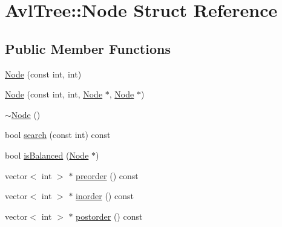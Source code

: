 \hypertarget{struct_avl_tree_1_1_node}{}\section{Avl\+Tree\+:\+:Node Struct Reference}
\label{struct_avl_tree_1_1_node}
\subsection*{Public Member Functions}
\begin{DoxyCompactItemize}
\item 
\mbox{\hyperlink{struct_avl_tree_1_1_node_a839da38cdb6f85ea5a62aae90b0715bc}{Node}} (const int, int)
\item 
\mbox{\hyperlink{struct_avl_tree_1_1_node_a5cecfa155288f9a123fe60206730bbce}{Node}} (const int, int, \mbox{\hyperlink{struct_avl_tree_1_1_node}{Node}} $\ast$, \mbox{\hyperlink{struct_avl_tree_1_1_node}{Node}} $\ast$)
\item 
\mbox{\hyperlink{struct_avl_tree_1_1_node_a772d991375b38b592da8a22f82ac343f}{$\sim$\+Node}} ()
\item 
bool \mbox{\hyperlink{struct_avl_tree_1_1_node_a9e6723c6082511451be1b87284201921}{search}} (const int) const
\item 
bool \mbox{\hyperlink{struct_avl_tree_1_1_node_aaacdd39b8f7f3ab623b4cacb28d098f9}{is\+Balanced}} (\mbox{\hyperlink{struct_avl_tree_1_1_node}{Node}} $\ast$)
\item 
vector$<$ int $>$ $\ast$ \mbox{\hyperlink{struct_avl_tree_1_1_node_a32cdbc0d1dece3f4885bf9eed0643dc0}{preorder}} () const
\item 
vector$<$ int $>$ $\ast$ \mbox{\hyperlink{struct_avl_tree_1_1_node_a6a079f1ec29ec22d78eda81218f61ead}{inorder}} () const
\item 
vector$<$ int $>$ $\ast$ \mbox{\hyperlink{struct_avl_tree_1_1_node_a66a6288a873ef3c15df03df04a5ad744}{postorder}} () const
\end{DoxyCompactItemize}
